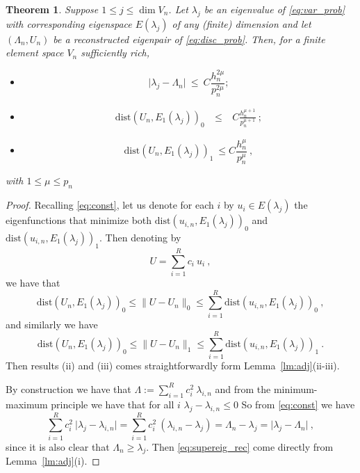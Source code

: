 \documentclass[preprint ,12pt]{elsarticle}
\newtheorem{theorem}{Theorem}[section]
\begin{document}
\begin{theorem}
\label{th:adj_rec}
Suppose  $ 1 \leq j\leq \dim V_n$. Let
$\lambda_j$ be an eigenvalue   of \eqref{eq:var_prob} with
corresponding eigenspace $E(\lambda_j)$ of any (finite) dimension  and
let $(\Lambda_n,U_n)$ be a reconstructed eigenpair  of \eqref{eq:disc_prob}.
Then, for a finite element space $V_n$ sufficiently rich,
\begin{itemize}
\item[(i)] 
\begin{equation}
\vert \lambda_j - \Lambda_n \vert \ \leq \ C
\frac{h_n^{2\mu} }{p_n^{2\mu}} ;  \label{eq:supereig_rec}
\end{equation}
\item[(ii)] 
\begin{eqnarray}
\mathrm{dist}(
U_n,E_1(\lambda_j))_{0}\ & \leq& \ C \frac{h_n^{\mu+1} }{p_n^{\mu+1}} \ ; \label{eq:adj_rec}
\end{eqnarray}
\item[(iii)]
\begin{equation}
\label{eq:energy_rec} \mathrm{dist}(
U_n,E_1(\lambda_j))_{1} \ \leq
C \frac{h_n^{\mu}}{p_n^{\mu}}\ ,
\end{equation}
\end{itemize}
with $1\leq \mu\leq p_n$
\end{theorem}

\begin{proof}
Recalling \eqref{eq:const}, let us denote for each $i$ by $u_i\in E(\lambda_j)$ the eigenfunctions that minimize both $\mathrm{dist}(
u_{i,n},E_1(\lambda_j))_{0}$ and $\mathrm{dist}(
u_{i,n},E_1(\lambda_j))_{1}$. Then denoting by 
$$
U=\sum_{i=1}^{R} c_i \ u_{i}\ ,
$$
we have that
$$
\mathrm{dist}(
U_n,E_1(\lambda_j))_{0}\leq \|U-U_n\|_{0}\leq \sum_{i=1}^{R} \mathrm{dist}(
u_{i,n},E_1(\lambda_j))_{0}\ ,
$$
and similarly we have
$$
\mathrm{dist}(
U_n,E_1(\lambda_j))_{0}\leq \|U-U_n\|_{1}\leq \sum_{i=1}^{R} \mathrm{dist}(
u_{i,n},E_1(\lambda_j))_{1}\ .
$$
Then results (ii) and (iii) comes straightforwardly form Lemma~\ref{lm:adj}(ii-iii).


By construction we have that $\Lambda:=\sum_{i=1}^{R} c_i^2 \ \lambda_{i,n}$ and from the minimum-maximum principle we have that for all $i$ $\lambda_j - \lambda_{i,n}\leq 0$
So from 
\eqref{eq:const} we have
$$
\sum_{i=1}^{R} c_i^2 \ \vert \lambda_j - \lambda_{i,n} \vert=
 \sum_{i=1}^{R} c_i^2 \ (\lambda_{i,n} - \lambda_j )=  \Lambda_n - \lambda_j
 = \vert \lambda_j - \Lambda_n \vert\ ,
$$
since it is also clear that $\Lambda_n\ge \lambda_j$. Then \eqref{eq:supereig_rec} come directly from 
Lemma~\ref{lm:adj}(i).


\end{proof}
\end{document}
